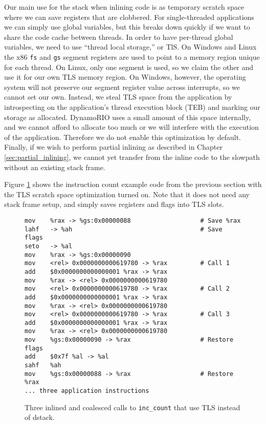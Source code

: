 Our main use for the stack when inlining code is as temporary scratch space
where we can save registers that are clobbered.  For single-threaded
applications we can simply use global variables, but this breaks down quickly if
we want to share the code cache between threads.  In order to have per-thread
global variables, we need to use ``thread local storage,'' or TlS.  On Windows
and Linux the x86 {\tt fs} and {\tt gs} segment registers are used to point to a
memory region unique for each thread.  On Linux, only one segment is used, so we
claim the other and use it for our own TLS memory region.  On Windows, however,
the operating system will not preserve our segment register value across
interrupts, so we cannot set our own.  Instead, we steal TLS space from the
application by introspecting on the application's thread execution block (TEB)
and marking our storage as allocated.\cite{inside_win2k}  DynamoRIO uses a small
amount of this space internally, and we cannot afford to allocate too much or we
will interfere with the execution of the application.  Therefore we do not
enable this optimization by default.  Finally, if we wish to perform partial
inlining as described in Chapter \ref{sec:partial_inlining}, we cannot yet
transfer from the inline code to the slowpath without an existing stack frame.

Figure \ref{fig:inscount_tls} shows the instruction count example code from the
previous section with the TLS scratch space optimization turned on.  Note that
it does not need any stack frame setup, and simply saves registers and flags
into TLS slots.

\begin{figure}
\begin{verbatim}
mov    %rax -> %gs:0x00000088                   # Save %rax
lahf   -> %ah                                   # Save flags
seto   -> %al 
mov    %rax -> %gs:0x00000090 
mov    <rel> 0x0000000000619780 -> %rax         # Call 1
add    $0x0000000000000001 %rax -> %rax 
mov    %rax -> <rel> 0x0000000000619780 
mov    <rel> 0x0000000000619780 -> %rax         # Call 2
add    $0x0000000000000001 %rax -> %rax 
mov    %rax -> <rel> 0x0000000000619780 
mov    <rel> 0x0000000000619780 -> %rax         # Call 3
add    $0x0000000000000001 %rax -> %rax 
mov    %rax -> <rel> 0x0000000000619780 
mov    %gs:0x00000090 -> %rax                   # Restore flags
add    $0x7f %al -> %al 
sahf   %ah 
mov    %gs:0x00000088 -> %rax                   # Restore %rax
... three application instructions
\end{verbatim}
\caption{Three inlined and coalesced calls to {\tt inc\_count} that use TLS
instead of dstack.}
\label{fig:inscount_tls}
\end{figure}

